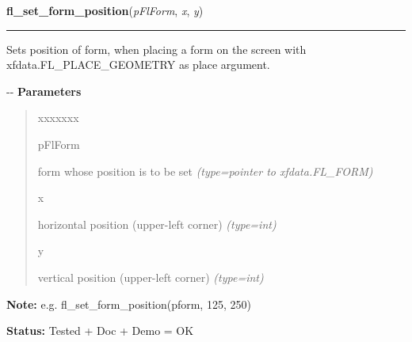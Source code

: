 \hspace{.8\funcindent}\begin{boxedminipage}{\funcwidth}

    \raggedright \textbf{fl\_set\_form\_position}(\textit{pFlForm}, \textit{x}, \textit{y})

    \vspace{-1.5ex}

    \rule{\textwidth}{0.5\fboxrule}
\setlength{\parskip}{2ex}

Sets position of form, when placing a form on the screen with
xfdata.FL\_PLACE\_GEOMETRY as place argument.

-{}-
\setlength{\parskip}{1ex}
      \textbf{Parameters}
      \vspace{-1ex}

      \begin{quote}
        \begin{Ventry}{xxxxxxx}

          \item[pFlForm]


form whose position is to be set
            {\it (type=pointer to xfdata.FL\_FORM)}

          \item[x]


horizontal position (upper-left corner)
            {\it (type=int)}

          \item[y]


vertical position (upper-left corner)
            {\it (type=int)}

        \end{Ventry}

      \end{quote}

\textbf{Note:} 
e.g. fl\_set\_form\_position(pform, 125, 250)


\textbf{Status:} 
Tested + Doc + Demo = OK


    \end{boxedminipage}

    \label{xformslib:flbasic:fl_set_form_title}

    \vspace{0.5ex}

